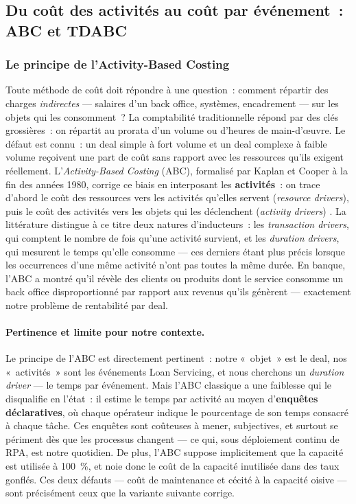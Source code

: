 \subsection{Du coût des activités au coût par événement~: ABC et TDABC}
\label{sec:abc}

\subsubsection{Le principe de l'Activity-Based Costing}

Toute méthode de coût doit répondre à une question~: comment répartir des charges
\emph{indirectes} --- salaires d'un back office, systèmes, encadrement --- sur les
objets qui les consomment~? La comptabilité traditionnelle répond par des clés
grossières~: on répartit au prorata d'un volume ou d'heures de main-d'œuvre. Le défaut
est connu~: un deal simple à fort volume et un deal complexe à faible volume reçoivent
une part de coût sans rapport avec les ressources qu'ils exigent réellement.
L'\textit{Activity-Based Costing} (ABC), formalisé par Kaplan et Cooper à la fin des
années 1980, corrige ce biais en interposant les \textbf{activités}~: on trace d'abord
le coût des ressources vers les activités qu'elles servent (\textit{resource drivers}),
puis le coût des activités vers les objets qui les déclenchent (\textit{activity
drivers}) \cite{kaplan1988}. La littérature distingue à ce titre deux natures
d'inducteurs~: les \textit{transaction drivers}, qui comptent le nombre de fois qu'une
activité survient, et les \textit{duration drivers}, qui mesurent le temps qu'elle
consomme --- ces derniers étant plus précis lorsque les occurrences d'une même activité
n'ont pas toutes la même durée. En banque, l'ABC a montré qu'il révèle des clients ou
produits dont le service consomme un back office disproportionné par rapport aux revenus
qu'ils génèrent --- exactement notre problème de rentabilité par deal.

\paragraph{Pertinence et limite pour notre contexte.}
Le principe de l'ABC est directement pertinent~: notre «~objet~» est le deal, nos
«~activités~» sont les événements Loan Servicing, et nous cherchons un
\textit{duration driver} --- le temps par événement. Mais l'ABC classique a une faiblesse
qui le disqualifie en l'état~: il estime le temps par activité au moyen d'\textbf{enquêtes
déclaratives}, où chaque opérateur indique le pourcentage de son temps consacré à chaque
tâche. Ces enquêtes sont coûteuses à mener, subjectives, et surtout se périment dès que
les processus changent --- ce qui, sous déploiement continu de RPA, est notre quotidien.
De plus, l'ABC suppose implicitement que la capacité est utilisée à 100~\%, et noie donc
le coût de la capacité inutilisée dans des taux gonflés. Ces deux défauts --- coût de
maintenance et cécité à la capacité oisive --- sont précisément ceux que la variante
suivante corrige.

